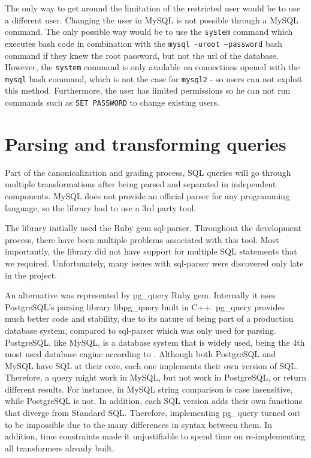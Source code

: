 The only way to get around the limitation of the restricted user would be to use a different user. Changing the user in MySQL is not possible through a MySQL command. The only possible way would be to use the \texttt{system} command which executes bash code in combination with the \texttt{mysql -uroot --password} bash command if they knew the root password, but not the url of the database. However, the \texttt{system} command is only available on connections opened with the \texttt{mysql} bash command, which is not the case for \texttt{mysql2} - so users can not exploit this method. Furthermore, the user has limited permissions so he can not run commands such as \texttt{SET PASSWORD} to change existing users.



\section{Parsing and transforming queries}

Part of the canonicalization and grading process, SQL queries will go through multiple transformations after being parsed and separated in independent components. MySQL does not provide an official parser for any programming language, so the library had to use a 3rd party tool.

The library initially used the Ruby gem sql-parser. Throughout the development process, there have been multiple problems associated with this tool. Most importantly, the library did not have support for multiple SQL statements that we required. Unfortunately, many issues with sql-parser were discovered only late in the project.

An alternative was represented by pg\_query Ruby gem. Internally it uses PostgreSQL's parsing library libpg\_query built in C++. pg\_query provides much better code and stability, due to its nature of being part of a production database system, compared to sql-parser which was only used for parsing. PostgreSQL, like MySQL, is a database system that is widely used, being the 4th most used database engine according to \cite{db_engine:statistics}. Although both PostgreSQL and MySQL have SQL at their core, each one implements their own version of SQL. Therefore, a query might work in MySQL, but not work in PostgreSQL, or return different results. For instance, in MySQL string comparison is case insensitive, while PostgreSQL is not. In addition, each SQL version adds their own functions that diverge from Standard SQL. Therefore, implementing pg\_query turned out to be impossible due to the many differences in syntax between them. In addition, time constraints made it unjustifiable to spend time on re-implementing all transformers already built.

